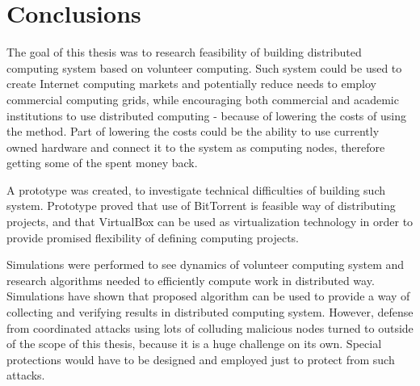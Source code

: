 \chapter{Conclusions}

The goal of this thesis was to research feasibility of building distributed computing system based on volunteer computing. Such system could be used to create Internet computing markets and potentially reduce needs to employ commercial computing grids, while encouraging both commercial and academic institutions to use distributed computing - because of lowering the costs of using the method. Part of lowering the costs could be the ability to use currently owned hardware and connect it to the system as computing nodes, therefore getting some of the spent money back.

A prototype was created, to investigate technical difficulties of building such system. Prototype proved that use of BitTorrent is feasible way of distributing projects, and that VirtualBox can be used as virtualization technology in order to provide promised flexibility of defining computing projects. 

Simulations were performed to see dynamics of volunteer computing system and research algorithms needed to efficiently compute work in distributed way. Simulations have shown that proposed algorithm can be used to provide a way of collecting and verifying results in distributed computing system. However, defense from coordinated attacks using lots of colluding malicious nodes turned to outside of the scope of this thesis, because it is a huge challenge on its own. Special protections would have to be designed and employed just to protect from such attacks.

